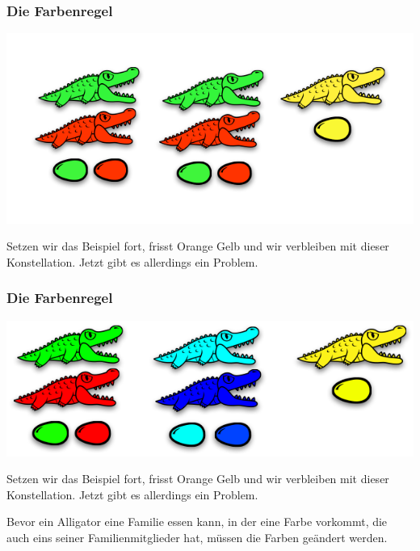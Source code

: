 \documentclass{beamer}
\begin{document}

\begin{frame}
\frametitle{Die Farbenregel}

\begin{center}
\includegraphics[scale=0.35]{eatingrule_4.png} 
\end{center}

Setzen wir das Beispiel fort, frisst Orange Gelb und wir verbleiben mit dieser Konstellation.
Jetzt gibt es allerdings ein Problem.

\end{frame}


\begin{frame}
\frametitle{Die Farbenregel}

\begin{center}
\includegraphics[scale=0.35]{colorrule_1.png} 
\end{center}

Setzen wir das Beispiel fort, frisst Orange Gelb und wir verbleiben mit dieser Konstellation.
Jetzt gibt es allerdings ein Problem.

Bevor ein Alligator eine Familie essen kann, in der eine Farbe vorkommt, die auch eins seiner Familienmitglieder hat, müssen die Farben geändert werden.

\end{frame}
\end{document}
